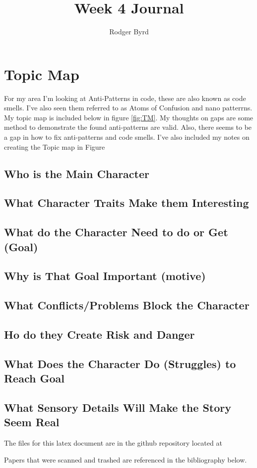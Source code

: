 \documentclass[conference]{IEEEtran}
\begin{document}

\title{Week 4 Journal}
\author{Rodger Byrd}
\maketitle


\section{Topic Map}
For my area I'm looking at Anti-Patterns in code, these are also known as code smells. I've also seen them referred to as Atoms of Confusion and nano patterrns. My topic map is included below in figure \ref{fig:TM}. My thoughts on gaps are some method to demonstrate the found anti-patterns are valid. Also, there seems to be a gap in how to fix anti-patterns and code smells. I've also included my notes on creating the Topic map in Figure 

\subsection{Who is the Main Character}
\subsection{What Character Traits Make them Interesting}
\subsection{What do the Character Need to do or Get (Goal)}
\subsection{Why is That Goal Important (motive)}
\subsection{What Conflicts/Problems Block the Character}
\subsection{Ho do they Create Risk and Danger}
\subsection{What Does the Character Do (Struggles) to Reach Goal}
\subsection{What Sensory Details Will Make the Story Seem Real}

The files for this latex document are in the github repository located at 

Papers that were scanned and trashed are referenced in the bibliography below. 
\nocite{*}
\clearpage




\end{document}
